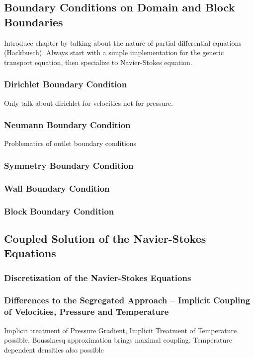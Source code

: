 \documentclass[article,type=msc,colorback,accentcolor=tud2a]{tudthesis}
\begin{document}
    \subsection{Boundary Conditions on Domain and Block Boundaries}
        Introduce chapter by talking about the nature of partial differential equations (Hackbusch). Always start with a simple implementation for the generic transport equation, then specialize to Navier-Stokes equation.
      \subsubsection{Dirichlet Boundary Condition}
        Only talk about dirichlet for velocities not for pressure.
      \subsubsection{Neumann Boundary Condition}
        Problematics of outlet boundary conditions
      \subsubsection{Symmetry Boundary Condition}
      \subsubsection{Wall Boundary Condition}
      \subsubsection{Block Boundary Condition}
      
    \subsection{Coupled Solution of the Navier-Stokes Equations}

      \subsubsection{Discretization of the Navier-Stokes Equations}
      \subsubsection{Differences to the Segregated Approach -- Implicit Coupling of Velocities, Pressure and Temperature}

          Implicit treatment of Pressure Gradient, Implicit Treatment of Temperature possible, Boussinesq approximation brings maximal coupling. Temperature dependent densities also possible
\end{document}

